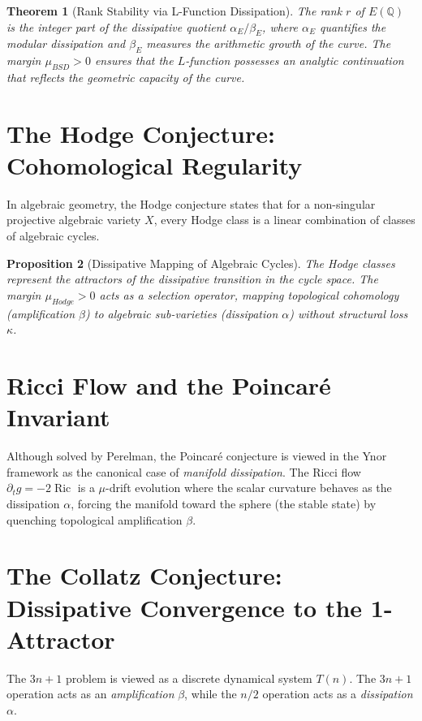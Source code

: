 \documentclass[11pt,a4paper]{amsart}
\newtheorem{theorem}{Theorem}[section]
\newtheorem{proposition}[theorem]{Proposition}
\newcommand{\alphacoeff}{\ensuremath{\alpha}}
\newcommand{\betacoeff}{\ensuremath{\beta}}
\newcommand{\kappacoeff}{\ensuremath{\kappa}}
\newcommand{\mumargin}{\ensuremath{\mu}}
\begin{document}
\begin{theorem}[Rank Stability via L-Function Dissipation]
The rank $r$ of $E(\mathbb{Q})$ is the integer part of the dissipative 
quotient $\alphacoeff_{E} / \betacoeff_{E}$, where $\alphacoeff_{E}$ 
quantifies the modular dissipation and $\betacoeff_{E}$ measures the 
arithmetic growth of the curve. The margin $\mumargin_{BSD} > 0$ ensures 
that the $L$-function possesses an analytic continuation that reflects 
the geometric capacity of the curve.
\end{theorem}

\section{The Hodge Conjecture: Cohomological Regularity}
In algebraic geometry, the Hodge conjecture states that for a non-singular 
projective algebraic variety $X$, every Hodge class is a linear combination of 
classes of algebraic cycles.

\begin{proposition}[Dissipative Mapping of Algebraic Cycles]
The Hodge classes represent the \emph{attractors} of the dissipative 
transition in the cycle space. The margin $\mumargin_{Hodge} > 0$ 
acts as a selection operator, mapping topological cohomology (amplification 
$\betacoeff$) to algebraic sub-varieties (dissipation $\alphacoeff$) 
without structural loss $\kappacoeff$.
\end{proposition}

\section{Ricci Flow and the Poincaré Invariant}
Although solved by Perelman, the Poincaré conjecture is viewed in the Ynor 
framework as the canonical case of \emph{manifold dissipation}. The Ricci 
flow $\partial_t g = -2\operatorname{Ric}$ is a $\mumargin$-drift evolution 
where the scalar curvature behaves as the dissipation $\alphacoeff$, forcing 
the manifold toward the sphere (the stable state) by quenching 
topological amplification $\betacoeff$.

\section{The Collatz Conjecture: Dissipative Convergence to the 1-Attractor}
The $3n+1$ problem is viewed as a discrete dynamical system $T(n)$. 
The $3n+1$ operation acts as an \emph{amplification} $\betacoeff$, 
while the $n/2$ operation acts as a \emph{dissipation} $\alphacoeff$. 
\end{document}

